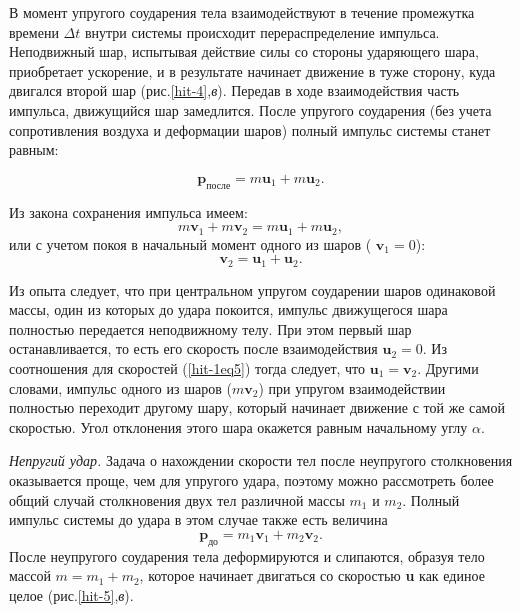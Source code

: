 \documentclass[14pt,a4paper,oneside]{extarticle}	%
\begin{document}
В момент упругого соударения тела взаимодействуют в течение промежутка времени $ \Delta t $ внутри системы происходит перераспределение импульса.
Неподвижный шар, испытывая действие силы со стороны ударяющего шара, приобретает ускорение, и в результате начинает движение в туже сторону, куда двигался второй шар (рис.\ref{hit-4},\textit{в}).
Передав в ходе взаимодействия часть импульса, движущийся шар замедлится.
После упругого соударения (без учета сопротивления воздуха и деформации шаров) полный импульс системы станет равным:

	\begin{equation}\label{hit-1eq3}
\textbf{p}_{\text{после}}  = m \textbf{u}_1 + m \textbf{u}_2.
\end{equation}

Из закона сохранения импульса имеем:
	\begin{equation}\label{hit-1eq4}
m \textbf{v}_1 + m \textbf{v}_2  = m \textbf{u}_1 + m \textbf{u}_2,
\end{equation}
или с учетом покоя в начальный момент одного из шаров ( $ \textbf{v}_1=0 $):
	\begin{equation}\label{hit-1eq5}
\textbf{v}_2  = \textbf{u}_1 + \textbf{u}_2.
\end{equation}

Из опыта следует, что при центральном упругом соударении шаров одинаковой массы, один из которых до удара покоится, импульс движущегося шара полностью передается неподвижному телу.
При этом первый шар останавливается, то есть его скорость после взаимодействия $ \textbf{u}_2=0 $.  
Из соотношения для скоростей (\ref{hit-1eq5}) тогда следует, что $ \textbf{u}_1  = \textbf{v}_2 $.
Другими словами, импульс одного из шаров ($ m\textbf{v}_2 $) при упругом взаимодействии полностью переходит другому шару, который начинает движение с той же самой скоростью.
Угол отклонения этого шара окажется равным начальному углу $ \alpha $.

\textit{Непругий удар.}
Задача о нахождении скорости тел после неупругого столкновения оказывается проще, чем для упругого удара, поэтому можно рассмотреть более общий случай столкновения двух тел различной массы  $ m_1 $ и  $ m_2 $.
Полный импульс системы до удара в этом случае также есть величина $$ \textbf{p}_{\text{до}}  = m_1 \textbf{v}_1 + m_2 \textbf{v}_2.$$
После неупругого соударения тела деформируются и слипаются, образуя тело массой $m = m_1 + m_2 $, которое начинает двигаться со скоростью \textbf{u} как единое целое (рис.\ref{hit-5},\textit{в}).
\end{document}
